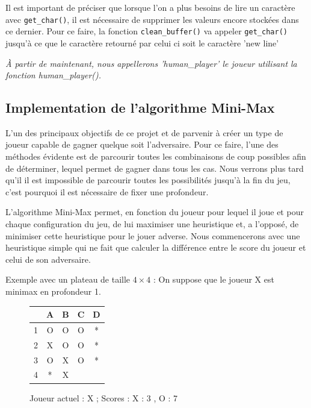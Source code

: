 \documentclass{report}
\begin{document}
Il est important de préciser que lorsque l'on a plus besoins de lire un caractère avec \texttt{get\_char()}, il est nécessaire de supprimer les valeurs encore stockées dans ce dernier. Pour ce faire, la fonction \texttt{clean\_buffer()} va appeler \texttt{get\_char()} jusqu'à ce que le caractère retourné par celui ci soit le caractère 'new line'

\textit{À partir de maintenant, nous appellerons 'human\_player' le joueur utilisant la fonction human\_player().}


\subsection{Implementation de l'algorithme Mini-Max}
L'un des principaux objectifs de ce projet et de parvenir à créer un type de joueur capable de gagner quelque soit l'adversaire. Pour ce faire, l'une des méthodes évidente est de parcourir toutes les combinaisons de coup possibles afin de déterminer, lequel permet de gagner dans tous les cas. Nous verrons plus tard qu'il il est impossible de parcourir toutes les possibilités jusqu'à la fin du jeu, c'est pourquoi il est nécessaire de fixer une profondeur.

L'algorithme Mini-Max permet, en fonction du joueur pour lequel il joue et pour chaque configuration du jeu, de lui maximiser une heuristique et, a l'opposé, de minimiser cette heuristique pour le jouer adverse.
Nous commencerons avec une heuristique simple qui ne fait que calculer la différence entre le score du joueur et celui de son adversaire.
\newline

Exemple avec un plateau de taille $4\times4$ :
On suppose que le joueur X est minimax en profondeur 1.

\begin{figure}[!h]
\begin{center}
\renewcommand{\arraystretch} {1.5}
    \begin{tabular}{c|c|c|c|c|}
          &A & B & C & D \\
        \hline
        1 & O & O & O & *\\
        \hline
        2 & X & O & O & * \\
        \hline
        3 & O & X & O & * \\
        \hline
        4 & * & X &  &  \\
        \hline
    \end{tabular}

\end{center}
\begin{center}
    \label{Figure 1}
    \caption{Joueur actuel : X ; Scores : X : 3 , O : 7}
\end{center}
\end{figure}
\end{document}
